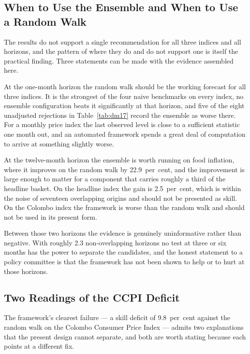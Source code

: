 \documentclass[12pt]{article}
\begin{document}
\subsection{When to Use the Ensemble and When to Use a Random Walk}

The results do not support a single recommendation for all three indices and
all horizons, and the pattern of where they do and do not support one is
itself the practical finding. Three statements can be made with the evidence
assembled here.

At the one-month horizon the random walk should be the working forecast for all
three indices. It is the strongest of the four naive benchmarks on every index,
no ensemble configuration beats it significantly at that horizon, and five of
the eight unadjusted rejections in Table~\ref{tab:dm17} record the ensemble as
worse there. For a monthly price index the last observed level is close to a
sufficient statistic one month out, and an automated framework spends a great
deal of computation to arrive at something slightly worse.

At the twelve-month horizon the ensemble is worth running on food inflation,
where it improves on the random walk by 22.9~per~cent, and the improvement is
large enough to matter for a component that carries roughly a third of the
headline basket. On the headline index the gain is 2.5~per~cent, which is
within the noise of seventeen overlapping origins and should not be presented
as skill. On the Colombo index the framework is worse than the random walk and
should not be used in its present form.

Between those two horizons the evidence is genuinely uninformative rather than
negative. With roughly 2.3 non-overlapping horizons no test at three or six
months has the power to separate the candidates, and the honest statement to a
policy committee is that the framework has not been shown to help or to hurt at
those horizons.

\subsection{Two Readings of the CCPI Deficit}

The framework's clearest failure --- a skill deficit of 9.8~per~cent against the
random walk on the Colombo Consumer Price Index --- admits two explanations that
the present design cannot separate, and both are worth stating because each
points at a different fix.
\end{document}
